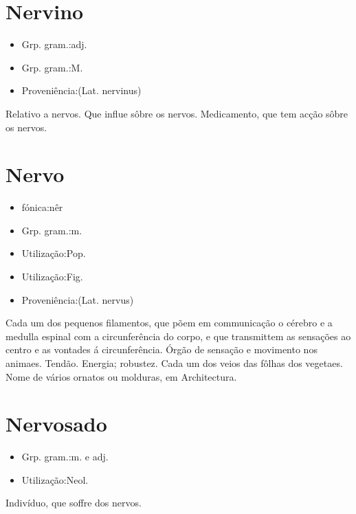\section{Nervino}
\begin{itemize}
\item {Grp. gram.:adj.}
\end{itemize}
\begin{itemize}
\item {Grp. gram.:M.}
\end{itemize}
\begin{itemize}
\item {Proveniência:(Lat. \textunderscore nervinus\textunderscore )}
\end{itemize}
Relativo a nervos.
Que influe sôbre os nervos.
Medicamento, que tem acção sôbre os nervos.
\section{Nervo}
\begin{itemize}
\item {fónica:nêr}
\end{itemize}
\begin{itemize}
\item {Grp. gram.:m.}
\end{itemize}
\begin{itemize}
\item {Utilização:Pop.}
\end{itemize}
\begin{itemize}
\item {Utilização:Fig.}
\end{itemize}
\begin{itemize}
\item {Proveniência:(Lat. \textunderscore nervus\textunderscore )}
\end{itemize}
Cada um dos pequenos filamentos, que põem em communicação o cérebro e a medulla espinal com a circunferência do corpo, e que transmittem as sensações ao centro e as vontades á circunferência.
Órgão de sensação e movimento nos animaes.
Tendão.
Energia; robustez.
Cada um dos veios das fôlhas dos vegetaes.
Nome de vários ornatos ou molduras, em Architectura.
\section{Nervosado}
\begin{itemize}
\item {Grp. gram.:m.  e  adj.}
\end{itemize}
\begin{itemize}
\item {Utilização:Neol.}
\end{itemize}
Indivíduo, que soffre dos nervos.
